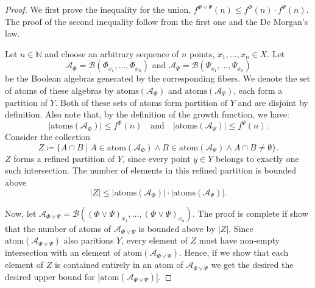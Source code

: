 \begin{proof}

    We first prove the inequality for the union, $f^{\Phi \lor \Psi}(n) \le f^\Phi(n) \cdot f^\Psi(n)$. The proof of the second inequality follow from the first one and the De Morgan's law.

    Let $n \in \mathbb{N}$ and choose an arbitrary sequence of $n$ points, $x_1, \dots, x_n \in X$. Let
    \[
        \mathcal{A}_\Phi = \mathcal{B}(\Phi_{x_1}, \dots, \Phi_{x_n}) \text{ and } \mathcal{A}_\Psi = \mathcal{B}(\Psi_{x_1}, \dots, \Psi_{x_n})
    \]
    be the Boolean algebras generated by the corresponding fibers. We denote the set of atoms of these algebras by $\text{atoms}(\mathcal{A}_\Phi)$ and $\text{atoms}(\mathcal{A}_\Psi)$, each form a partition of $Y$. Both of these sets of atoms form partition of $Y$ and are disjoint by definition. Also note that, by the definition of the growth function, we have:
    \[
        |\text{atoms}(\mathcal{A}_\Phi)| \le f^\Phi(n) \quad \text{and} \quad |\text{atoms}(\mathcal{A}_\Psi)| \le f^\Psi(n).
    \]
    Consider the collection
    \[
        Z \coloneq \{A \cap B \mid A \in \text{atom}(\mathcal{A}_\Phi) \land B \in \text{atom}(\mathcal{A}_\Psi) \land A \cap B \neq \emptyset \}.
    \]
    $Z$ forms a refined partition of $Y$, since every point $y \in Y$ belongs to exactly one such intersection. The number of elements in this refined partition is bounded above
    \[
        |Z| \leq |\text{atoms}(\mathcal{A}_\Phi)| \cdot |\text{atoms}(\mathcal{A}_\Psi)|.
    \]

    Now, let $\mathcal{A}_{\Phi \lor \Psi} = \mathcal{B}((\Phi \lor \Psi)_{x_1}, \dots, (\Phi \lor \Psi)_{x_n})$. The proof is complete if show that the number of atoms of $\mathcal{A}_{\Phi \lor \Psi}$ is bounded above by $|Z|$. Since $\text{atom}(\mathcal{A}_{\Phi \lor \Psi})$ also paritions $Y$, every element of $Z$ must have non-empty intersection with an element of $\text{atom}(\mathcal{A}_{\Phi \lor \Psi})$. Hence, if we show that each element of $Z$ is contained entirely in an atom of $\mathcal{A}_{\Phi \lor \Psi}$ we get the desired the desired upper bound for $|\text{atom}(\mathcal{A}_{\Phi \lor \Psi})|$.


\end{proof}
